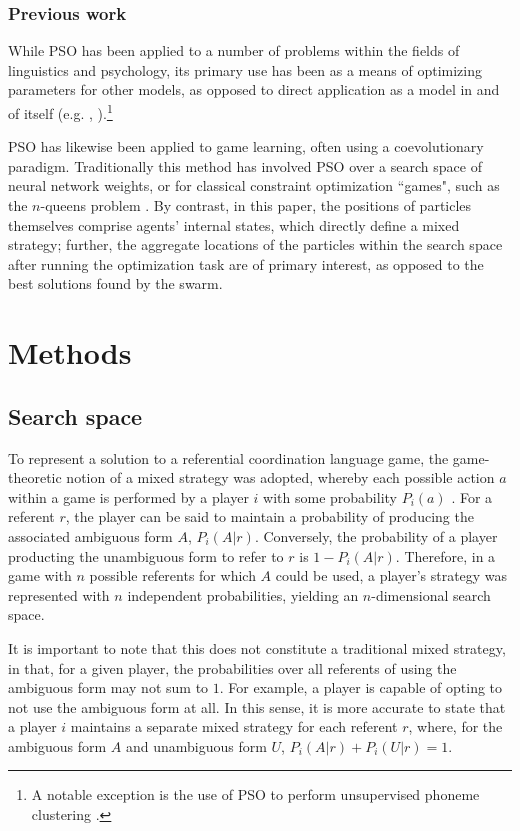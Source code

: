 \documentclass[a4paper,11pt]{article}
\begin{document}
\subsubsection{Previous work}
\label{sec:pso_prev_work}

While PSO has been applied to a number of problems within the fields of linguistics and psychology, its primary use has been as a means of optimizing parameters for other models, as opposed to direct application as a model in and of itself (e.g. \citeauthor{mehdad2009}, ).\footnote{A notable exception is the use of PSO to perform unsupervised phoneme clustering \cite{ahmadi2007}.}

PSO has likewise been applied to game learning, often using a coevolutionary paradigm. Traditionally this method has involved PSO over a search space of neural network weights, or for classical constraint optimization ``games", such as the $n$-queens problem \cite{engelbrecht2005}. By contrast, in this paper, the positions of particles themselves comprise agents' internal states, which directly define a mixed strategy; further, the aggregate locations of the particles within the search space after running the optimization task are of primary interest, as opposed to the best solutions found by the swarm.


\section{Methods}
\subsection{Search space}
\label{sec:search_space}
To represent a solution to a referential coordination language game, the game-theoretic notion of a mixed strategy was adopted, whereby each possible action $a$ within a game is performed by a player $i$ with some probability $P_i(a)$ \cite{benz2005}. For a referent $r$, the player can be said to maintain a probability of producing the associated ambiguous form $A$, $P_i(A|r)$. Conversely, the probability of a player producting the unambiguous form to refer to $r$ is $1 - P_i(A|r)$. Therefore, in a game with $n$ possible referents for which $A$ could be used, a player's strategy was represented with $n$ independent probabilities, yielding an $n$-dimensional search space. 

It is important to note that this does not constitute a traditional mixed strategy, in that, for a given player, the probabilities over all referents of using the ambiguous form may not sum to $1$.  For example, a player is capable of opting to not use the ambiguous form at all. In this sense, it is more accurate to state that a player $i$ maintains a separate mixed strategy for each referent $r$, where, for the ambiguous form $A$ and unambiguous form $U$, $P_i(A|r) + P_i(U|r) = 1$.
\end{document}
